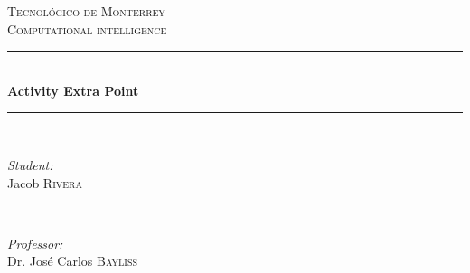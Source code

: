 \documentclass{article}
\begin{document}
\begin{titlepage}

    \newcommand{\HRule}{\rule{\linewidth}{0.5mm}} %

    \center %


    \textsc{\LARGE Tecnológico de Monterrey}\\[1.5cm] %
    \textsc{\Large Computational intelligence}\\[0.5cm] %


    \HRule \\[0.4cm]
    { \huge \bfseries Activity Extra Point}\\[0.4cm] %
    \HRule \\[1.5cm]


    \begin{minipage}{0.4\textwidth}
    \begin{flushleft} \large
    \emph{Student:}\\
    Jacob \textsc{Rivera} %
    \end{flushleft}
    \end{minipage}
    ~
    \begin{minipage}{0.4\textwidth}
    \begin{flushright} \large
    \emph{Professor:} \\
    Dr. José Carlos \textsc{Bayliss} %
    \end{flushright}
    \end{minipage}\\[2cm]


\end{titlepage}
\end{document}
